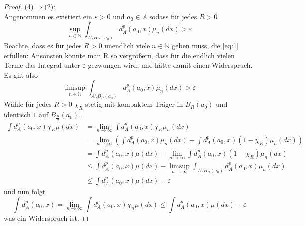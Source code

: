 \begin{proof}
(4)$\Rightarrow$(2): \\
Angenommen es existiert ein $\varepsilon > 0$ und $a_0 \in A$ sodass für jedes $R>0$ 
\begin{equation} \label{eq:1}
\sup\limits_{n\in\mathbb{N}}\int_{A\setminus B_R(a_0)}d_A^p(a_0, x)\mu_n(dx)>\varepsilon
\end{equation}
Beachte, dass es für jedes $R>0$ unendlich viele $n \in \mathbb{N}$ geben muss, die \ref{eq:1} erfüllen: Ansonsten könnte man R so vergrößern, dass für die endlich vielen Terme das Integral unter $\varepsilon$ gezwungen wird, und hätte damit einen Widerspruch. Es gilt also
$$\limsup\limits_{n\in\mathbb{N}}\int_{A\setminus B_R(a_0)}d^p_A(a_0, x)\mu_n(dx)>\varepsilon$$
Wähle für jedes $R>0$ $\chi_R$ stetig mit kompaktem Träger in $B_R(a_0)$ und identisch $1$ auf $B_{\frac{R}{2}}(a_0)$.
\begin{align*}
    \int d^p_A(a_0, x)\chi_R\mu(dx) &= \lim\limits_{n\rightarrow\infty}\int d^p_A(a_0, x)\chi_R \mu_n(dx) \\
    &= \lim\limits_{n\rightarrow\infty}\left(\int d^p_A(a_0, x)\mu_n(dx) - \int d^p_A(a_0, x)(1-\chi_R)\mu_n(dx) \right) \\
    &= \int d^p_A(a_0, x)\mu(dx) - \lim\limits_{n\rightarrow\infty}\int d^p_A(a_0, x)(1-\chi_R)\mu_n(dx) \\
    &\leq \int d^p_A(a_0, x)\mu(dx) - \limsup\limits_{n\rightarrow\infty} \int_{A\setminus B_R(a_0)}d^p_A(a_0, x)\mu_n(dx) \\
    &\leq \int d^p_A(a_0, x)\mu(dx) - \varepsilon
\end{align*}
und nun folgt
$$\int d^p_A(a_0, x) = \lim\limits_{n\rightarrow\infty} \int d^p_A(a_0, x)\chi_n\mu(dx) \leq \int d^p_A(a_0, x)\mu(dx) - \varepsilon$$
was ein Widerspruch ist.
\end{proof}
